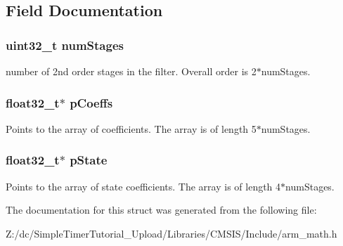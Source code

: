 \subsection{Field Documentation}
\hypertarget{structarm__biquad__casd__df1__inst__f32_aed9c8a6224cd149e8e12b17b25b9b767}{
\subsubsection[{num\-Stages}]{\setlength{\rightskip}{0pt plus 5cm}uint32\-\_\-t num\-Stages}}\label{structarm__biquad__casd__df1__inst__f32_aed9c8a6224cd149e8e12b17b25b9b767}
number of 2nd order stages in the filter. Overall order is 2$\ast$num\-Stages. \hypertarget{structarm__biquad__casd__df1__inst__f32_aacbb8dd8eeba4b21fc2bb40076405ee3}{
\subsubsection[{p\-Coeffs}]{\setlength{\rightskip}{0pt plus 5cm}float32\-\_\-t$\ast$ p\-Coeffs}}\label{structarm__biquad__casd__df1__inst__f32_aacbb8dd8eeba4b21fc2bb40076405ee3}
Points to the array of coefficients. The array is of length 5$\ast$num\-Stages. \hypertarget{structarm__biquad__casd__df1__inst__f32_a335c87e6fdc4b96601d95a5de8b9c463}{
\subsubsection[{p\-State}]{\setlength{\rightskip}{0pt plus 5cm}float32\-\_\-t$\ast$ p\-State}}\label{structarm__biquad__casd__df1__inst__f32_a335c87e6fdc4b96601d95a5de8b9c463}
Points to the array of state coefficients. The array is of length 4$\ast$num\-Stages. 

The documentation for this struct was generated from the following file\-:\begin{DoxyCompactItemize}
\item 
Z\-:/dc/\-Simple\-Timer\-Tutorial\-\_\-\-Upload/\-Libraries/\-C\-M\-S\-I\-S/\-Include/arm\-\_\-math.\-h\end{DoxyCompactItemize}
